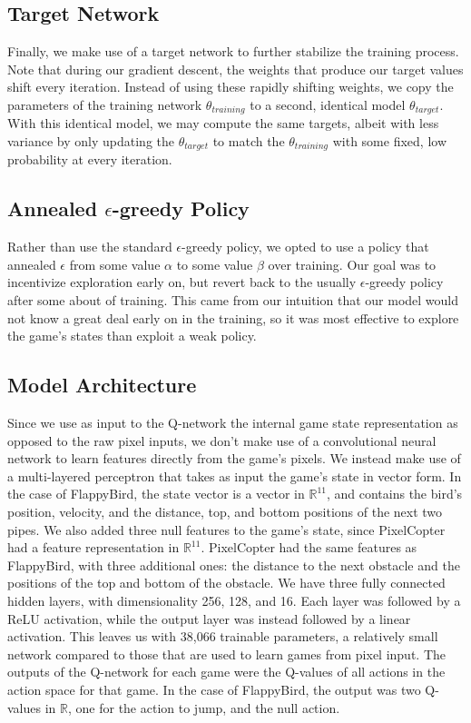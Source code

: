 \documentclass{article}
\begin{document}
\subsection{Target Network}
Finally, we make use of a target network to further stabilize the training process. 
Note that during our gradient descent, the weights that produce our target values shift every iteration.
Instead of using these rapidly shifting weights, we copy the parameters of the training network $\theta_{training}$ to a second, identical model $\theta_{target}$.
With this identical model, we may compute the same targets, albeit with less variance by only updating the $\theta_{target}$ to match the $\theta_{training}$ with some fixed, low probability at every iteration.

\subsection{Annealed $\epsilon$-greedy Policy}
Rather than use the standard $\epsilon$-greedy policy, we opted to use a policy that annealed $\epsilon$ from some value $\alpha$ to some value $\beta$ over training.
Our goal was to incentivize exploration early on, but revert back to the usually $\epsilon$-greedy policy after some about of training.
This came from our intuition that our model would not know a great deal early on in the training, so it was most effective to explore the game's states than exploit a weak policy.


\subsection{Model Architecture}
Since we use as input to the Q-network the internal game state representation as opposed to the raw pixel inputs, we don't make use of a convolutional neural network to learn features directly from the game's pixels.
We instead make use of a multi-layered perceptron that takes as input the game's state in vector form.
In the case of FlappyBird, the state vector is a vector in $\mathbb{R}^11$, and contains the bird's position, velocity, and the distance, top, and bottom positions of the next two pipes.
We also added three null features to the game's state, since PixelCopter had a feature representation in $\mathbb{R}^{11}$.
PixelCopter had the same features as FlappyBird, with three additional ones: the distance to the next obstacle and the positions of the top and bottom of the obstacle.
We have three fully connected hidden layers, with dimensionality 256, 128, and 16. 
Each layer was followed by a ReLU activation, while the output layer was instead followed by a linear activation. 
This leaves us with 38,066 trainable parameters, a relatively small network compared to those that are used to learn games from pixel input.
The outputs of the Q-network for each game were the Q-values of all actions in the action space for that game.
In the case of FlappyBird, the output was two Q-values in $\mathbb{R}$, one for the action to jump, and the null action.
\end{document}
